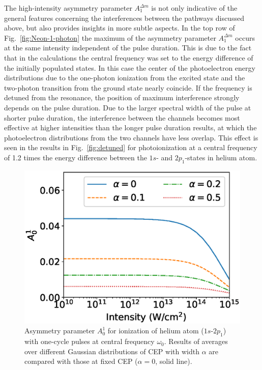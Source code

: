 The high-intensity asymmetry parameter $A_1^{\Delta m}$ is not only indicative of the general features concerning the interferences between the pathways discussed above, but also provides insights in more subtle aspects. In the top row of Fig.~\ref{fig:Neon-1-photon} the maximum of the asymmetry parameter $A_1^{\Delta m}$ occurs at the same intensity independent of the pulse duration. This is due to the fact that in the calculations the central frequency was set to the energy difference of the initially populated states. In this case the center of the photoelectron energy distributions due to the one-photon ionization from the excited state and the two-photon transition from the ground state nearly coincide\cite{crosssec}. If the frequency is detuned from the resonance, the position of maximum interference strongly depends on the pulse duration. Due to the larger spectral width of the pulse at shorter pulse duration, the interference between the channels becomes most effective at higher intensities than the longer pulse duration results, at which the photoelectron distributions from the two channels have less overlap. This effect is seen in the results in Fig.\ \ref{fig:detuned} for photoionization at a central frequency of 1.2 times the energy difference between the $1s$- and $2p_1$-states in helium atom. 

\begin{figure}[t]
\centering
\includegraphics[width=.45\linewidth]{figs/Photo_ionization/GAP/He_2p1_asym_alpha.eps}
\caption{
Asymmetry parameter $A_0^1$ for ionization of helium atom ($1s$-$2p_1$) with one-cycle pulses at central frequency $\omega_0$. Results of averages over different Gaussian distributions of CEP with width $\alpha$ are compared with those at fixed CEP ($\alpha =0$, solid line).
} 
  \label{fig:cep_avg}
\end{figure}

